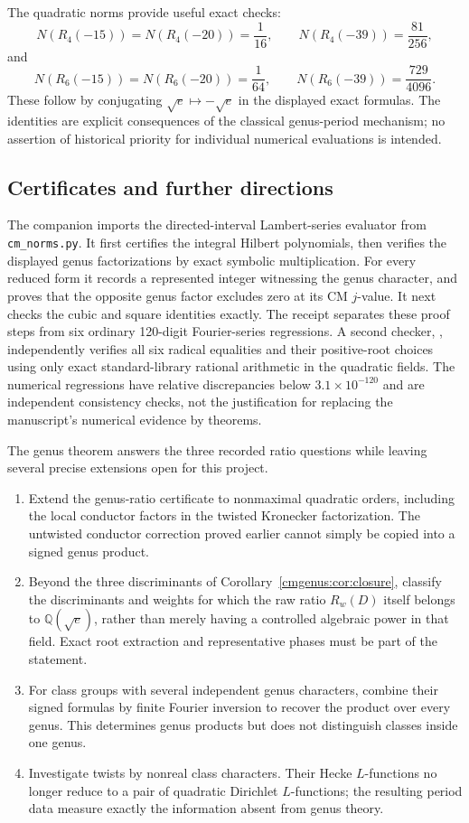 The quadratic norms provide useful exact checks:
\[
 N(R_4(-15))=N(R_4(-20))=\frac1{16},\qquad
 N(R_4(-39))=\frac{81}{256},
\]
and
\[
 N(R_6(-15))=N(R_6(-20))=\frac1{64},\qquad
 N(R_6(-39))=\frac{729}{4096}.
\]
These follow by conjugating $\sqrt e\mapsto-\sqrt e$ in the displayed
exact formulas. The identities are explicit consequences of the
classical genus-period mechanism; no assertion of historical priority
for individual numerical evaluations is intended.



\subsection{Certificates and further directions}

The companion  imports the directed-interval
Lambert-series evaluator from \mbox{\texttt{cm\_norms.py}}. It first certifies
the integral Hilbert polynomials, then verifies the displayed genus
factorizations by exact symbolic multiplication. For every reduced
form it records a represented integer witnessing the genus character,
and proves that the opposite genus factor excludes zero at its CM
$j$-value. It next checks the cubic and square identities exactly.
The receipt  separates these proof steps
from six ordinary 120-digit Fourier-series regressions. A second checker, , independently verifies
all six radical equalities and their positive-root choices using only exact
standard-library rational arithmetic in the quadratic fields. The numerical regressions
have relative discrepancies below $3.1\times10^{-120}$ and are
independent consistency checks, not the justification for replacing
the manuscript's numerical evidence by theorems.

The genus theorem answers the three recorded ratio questions while
leaving several precise extensions open for this project.
\begin{enumerate}
\item Extend the genus-ratio certificate to nonmaximal quadratic
orders, including the local conductor factors in the twisted
Kronecker factorization. The untwisted conductor correction proved
earlier cannot simply be copied into a signed genus product.
\item Beyond the three discriminants of Corollary~\ref{cmgenus:cor:closure},
classify the discriminants and weights for which the raw ratio
$R_w(D)$ itself belongs to $\mathbb Q(\sqrt e)$, rather than merely
having a controlled algebraic power in that field. Exact root
extraction and representative phases must be part of the statement.
\item For class groups with several independent genus characters,
combine their signed formulas by finite Fourier inversion to recover
the product over every genus. This determines genus products but does
not distinguish classes inside one genus.
\item Investigate twists by nonreal class characters. Their Hecke
$L$-functions no longer reduce to a pair of quadratic Dirichlet
$L$-functions; the resulting period data measure exactly the
information absent from genus theory.
\end{enumerate}
